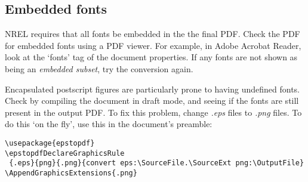 \subsection{Embedded fonts}
NREL requires that all fonts be embedded in the the final PDF. Check the PDF for embedded fonts using a PDF viewer. For example, in Adobe Acrobat Reader, look at the `fonts' tag of the document properties. If any fonts are not shown as being an \emph{embedded subset}, try the conversion again. 

Encapsulated postscript figures are particularly prone to having undefined fonts. Check by compiling the document in draft mode, and seeing if the fonts are still present in the output PDF. To fix this problem, change \emph{.eps} files to \emph{.png} files. To do this `on the fly', use this in the document's preamble:

\begin{lstlisting}
\usepackage{epstopdf}
\epstopdfDeclareGraphicsRule
 {.eps}{png}{.png}{convert eps:\SourceFile.\SourceExt png:\OutputFile}
\AppendGraphicsExtensions{.png}
\end{lstlisting}
